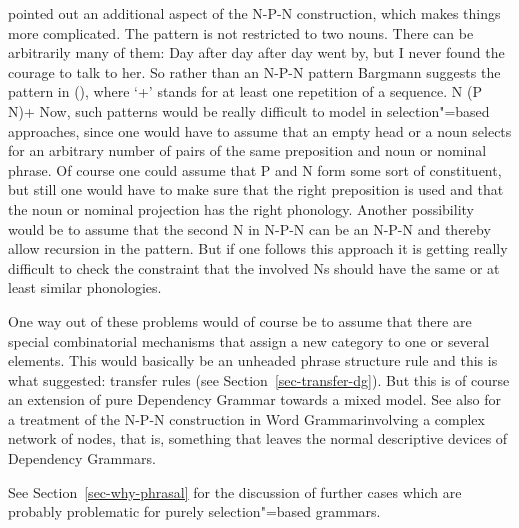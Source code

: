 \citet{Bargmann2015a} pointed out an additional aspect of the N-P-N construction, which makes things
more complicated. The pattern is not restricted to two nouns. There can be arbitrarily many of them:
\ea
Day after day after day went by, but I never found the courage to talk to her.
\z
So rather than an N-P-N pattern Bargmann suggests the pattern in (), where `+'\is{$+$} stands for at
least one repetition of a sequence.
\ea
\label{n-p-n-plus-cx}
N (P N)+
\z
Now, such patterns would be really difficult to model in selection"=based approaches, since one
would have to assume that an empty head or a noun selects for an arbitrary number of pairs of the
same preposition and noun or nominal phrase. Of course one could assume that P and N form some sort
of constituent, but still one would have to make sure that the right preposition is used and that the
noun or nominal projection has the right phonology. Another possibility would be to assume that the
second N in N-P-N can be an N-P-N and thereby allow recursion in the pattern. But if one follows
this approach it is getting really difficult to check the constraint that the involved Ns should
have the same or at least similar phonologies.

One way out of these problems would of course be to assume that there are special combinatorial
mechanisms that assign a new category to one or several elements. This would basically be an
unheaded phrase structure rule and this is what \tes suggested: transfer rules (see
Section~\ref{sec-transfer-dg}). But this is of course an extension of pure Dependency Grammar
towards a mixed model. See also \citet[--1477]{Hudson2021a} for a treatment of the N-P-N construction in
Word Grammar\indexwg involving a complex network of nodes, that is, something that leaves the normal
descriptive devices of Dependency Grammars.

See Section~\ref{sec-why-phrasal} for the discussion of further cases which are probably problematic
for purely selection"=based grammars.

\vspace{\baselineskip}

